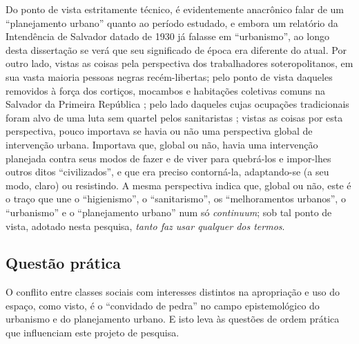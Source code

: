 Do ponto de vista estritamente técnico, é evidentemente anacrônico falar de um ``planejamento urbano'' quanto ao período estudado, e embora um relatório da Intendência de Salvador datado de 1930 já falasse em ``urbanismo'', ao longo desta dissertação se verá que seu significado de época era diferente do atual. Por outro lado, vistas as coisas pela perspectiva dos trabalhadores soteropolitanos, em sua vasta maioria pessoas negras recém-libertas; pelo ponto de vista daqueles removidos à força dos cortiços, mocambos e habitações coletivas comuns na Salvador da Primeira República \cite{cardoso1990proleta}; pelo lado daqueles cujas ocupações tradicionais foram alvo de uma luta sem quartel pelos sanitaristas \cite{barbosa2009}; vistas as coisas por esta perspectiva, pouco importava se havia ou não uma perspectiva global de intervenção urbana. Importava que, global ou não, havia uma intervenção planejada contra seus modos de fazer e de viver para quebrá-los e impor-lhes outros ditos ``civilizados'', e que era preciso contorná-la, adaptando-se (a seu modo, claro) ou resistindo. A mesma perspectiva indica que, global ou não, este é o traço que une o ``higienismo'', o ``sanitarismo'', os ``melhoramentos urbanos'', o ``urbanismo'' e o ``planejamento urbano'' num só \textit{continuum}; sob tal ponto de vista, adotado nesta pesquisa, \textit{tanto faz usar qualquer dos termos}. 

\subsection[Questão prática]{Questão prática}
\label{subsec:questprat}

O conflito entre classes sociais com interesses distintos na apropriação e uso do espaço, como visto, é o ``convidado de pedra'' no campo epistemológico do urbanismo e do planejamento urbano. E isto leva às questões de ordem prática que influenciam este projeto de pesquisa.

